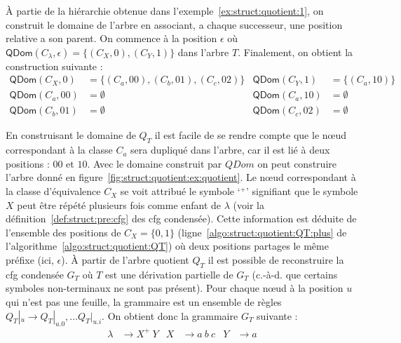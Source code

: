 \begin{example}%
    À partie de la hiérarchie obtenue dans l'exemple~\ref{ex:struct:quotient:1}, on construit le domaine de l'arbre en associant, a chaque successeur, une position relative a son parent. On commence à la position $\epsilon$ où $\textsf{QDom}(C_\lambda, \epsilon) = \{(C_X, 0), (C_Y, 1)\}$ dans l'arbre $T$.
    Finalement, on obtient la construction suivante :
    \begin{align*}
        \textsf{QDom}(C_X, 0)  & = \{(C_a, 00), (C_b, 01), (C_c, 02)\} & \textsf{QDom}(C_Y, 1)  & = \{(C_a, 10)\} \\
        \textsf{QDom}(C_a, 00) & = \emptyset                           & \textsf{QDom}(C_a, 10) & = \emptyset     \\
        \textsf{QDom}(C_b, 01) & = \emptyset                           & \textsf{QDom}(C_c, 02) & = \emptyset
    \end{align*}    

    En construisant le domaine de $Q_T$ il est facile de se rendre compte que le nœud correspondant à la classe $C_a$ sera dupliqué dans l'arbre, car il est lié à deux positions : $00$ et $10$.
    Avec le domaine construit par $QDom$ on peut construire l'arbre donné en figure~\ref{fig:struct:quotient:ex:quotient}.
    Le nœud correspondant à la classe d'équivalence $C_X$ se voit attribué le symbole `${}^+$' signifiant que le symbole $X$ peut être répété plusieurs fois comme enfant de $\lambda$ (voir la définition~\ref{def:struct:pre:cfg} des \gls{cfg} condensée).
    Cette information est déduite de l'ensemble des positions de $C_X = \{0, 1\}$ (ligne~\ref{algo:struct:quotient:QT:plus} de l'algorithme~\ref{algo:struct:quotient:QT}) où deux positions partages le même préfixe (ici, $\epsilon$).
    À partir de l'arbre quotient $Q_T$ il est possible de reconstruire la \gls{cfg} condensée $G_T$ où $T$ est une dérivation partielle de $G_T$ (c.-à-d. que certains symboles non-terminaux ne sont pas présent).
    Pour chaque nœud à la position $u$ qui n'est pas une feuille, la grammaire est un ensemble de règles $Q_T|_u \to Q_T|_{u.0}, \dots Q_T|_{u.i}$.
    On obtient donc la grammaire $G_T$ suivante :
    \begin{align*}
        \lambda & \to X^+ ~ Y & X & \to a ~ b ~ c & Y & \to a
    \end{align*}

\end{example}

